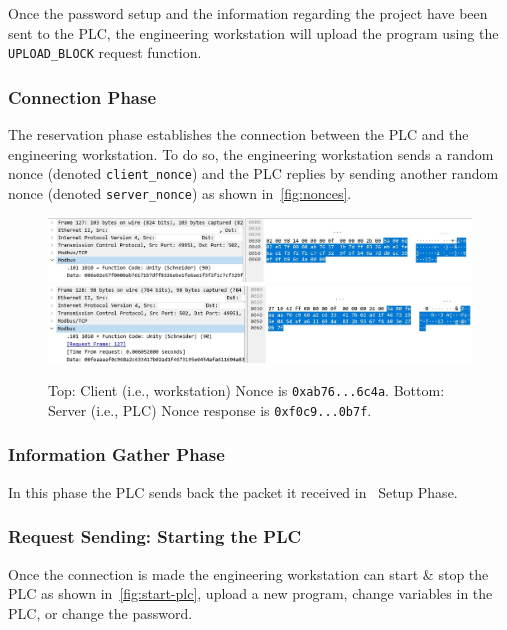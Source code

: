 Once the password setup and the information regarding the project have been sent to the PLC, the engineering workstation will upload the program using the \texttt{UPLOAD\_BLOCK} request function. 

\subsubsection{Connection Phase}

The reservation phase establishes the connection between the PLC and the engineering workstation. To do so, the engineering workstation sends a random nonce (denoted  \texttt{client\_nonce}) and the PLC replies by sending another random nonce (denoted  \texttt{server\_nonce}) as shown in~\autoref{fig:nonces}.

\begin{figure}[H]
    \centering
    \includegraphics[width=\linewidth]{figures/client_nonce.jpg} 
    \\ \vspace{0.5cm}
    \includegraphics[width=\linewidth]{figures/server-nonce.jpg}
    \caption{Top: Client (i.e., workstation) Nonce is \texttt{0xab76...6c4a}. Bottom: Server (i.e., PLC) Nonce response is \texttt{0xf0c9...0b7f}.}
    \label{fig:nonces}
\end{figure}

\subsubsection{Information Gather Phase}

In this phase the PLC sends back the packet it received in~ Setup Phase.

\subsubsection{Request Sending: Starting the PLC}

Once the connection is made the engineering workstation can start \& stop the PLC as shown in~\autoref{fig:start-plc}, upload a new program, change variables in the PLC, or change the password. 

